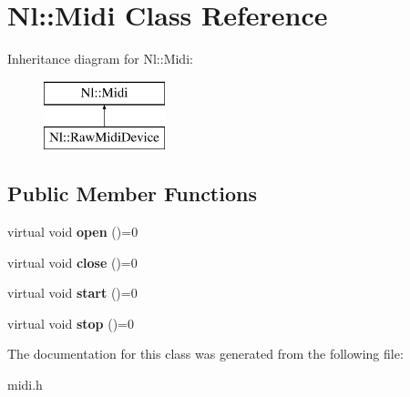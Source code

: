\hypertarget{classNl_1_1Midi}{}\section{Nl\+:\+:Midi Class Reference}
\label{classNl_1_1Midi}
Inheritance diagram for Nl\+:\+:Midi\+:\begin{figure}[H]
\begin{center}
\leavevmode
\includegraphics[height=2.000000cm]{classNl_1_1Midi}
\end{center}
\end{figure}
\subsection*{Public Member Functions}
\begin{DoxyCompactItemize}
\item 
\hypertarget{classNl_1_1Midi_add7d5ffb7a2b8cec766ee0aed15064bc}{}virtual void {\bfseries open} ()=0\label{classNl_1_1Midi_add7d5ffb7a2b8cec766ee0aed15064bc}

\item 
\hypertarget{classNl_1_1Midi_a2d831614cdfa8b799bdcf407f29210c9}{}virtual void {\bfseries close} ()=0\label{classNl_1_1Midi_a2d831614cdfa8b799bdcf407f29210c9}

\item 
\hypertarget{classNl_1_1Midi_a51f4fec3d17c920a3f5a500075c97d12}{}virtual void {\bfseries start} ()=0\label{classNl_1_1Midi_a51f4fec3d17c920a3f5a500075c97d12}

\item 
\hypertarget{classNl_1_1Midi_a4beb0e55eb868636f41777740733e5c5}{}virtual void {\bfseries stop} ()=0\label{classNl_1_1Midi_a4beb0e55eb868636f41777740733e5c5}

\end{DoxyCompactItemize}


The documentation for this class was generated from the following file\+:\begin{DoxyCompactItemize}
\item 
midi.\+h\end{DoxyCompactItemize}

